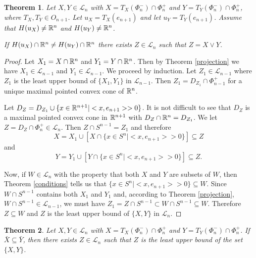 \documentclass[psamsfonts]{amsart}
\numberwithin{equation}{subsection}
\theoremstyle{plain}
\newtheorem{theorem}{Theorem}[section]
\theoremstyle{definition}
\theoremstyle{remark}
\begin{document}
\begin{theorem}  \label{OTHER}
Let $X, Y \in \mathcal{L}_n$ with $X = T_X(\Phi_n^-) \cap \Phi_n^+$ and $Y = T_Y(\Phi_n^-) \cap \Phi_n^+$, where $T_X, T_Y \in O_{n + 1}$. Let $u_X = T_X(e_{n + 1})$ and let $u_Y = T_Y(e_{n + 1})$. 
Assume that
$H(u_X) \not= \Bbb{R}^{n}$ and $H(u_Y) \not= \Bbb{R}^{n}$. 

If $H(u_X) \cap \Bbb{R}^{n} \not= H(u_Y) \cap \Bbb{R}^{n}$
 there exists $Z \in \mathcal{L}_{n}$ such that $Z = X \vee Y$. 
\end{theorem}
\begin{proof} Let $X_1 = X \cap \Bbb{R}^n$ and $Y_1 = Y  \cap \Bbb{R}^n$. Then
 by Theorem \ref{projection} we have 
 $X_1   \in \mathcal{L}_{n - 1} $ and $Y_1  \in \mathcal{L}_{n - 1}$.  We proceed by induction. Let $Z_1 \in \mathcal{L}_{n -1}$ where  $Z_1$ is the least upper bound of $\{X_1, Y_1\} $ in $
\mathcal{L}_{n -1}$.  Then  $Z_1 = D_{Z_1} \cap \Phi_{n - 1}^+$ for  a unique maximal pointed convex cone of $\Bbb{R}^n$. 

Let $D_Z = D_{Z_1} \cup \{x \in \Bbb{R}^{n + 1} | <x, e_{n + 1}> > 0\}$. It is not difficult to see that $D_Z$ is a maximal pointed convex cone in $\Bbb{R}^{n + 1}$ with $D_Z \cap \Bbb{R}^n = D_{Z_1}$.
We let $Z = D_Z \cap \Phi_n^+ \in \mathcal{L}_n$. Then 
$Z\cap S^{n - 1} = Z_1$ and therefore 
 $$X = X_1 \cup [X \cap \{x \in S^n | <x, e_{n + 1}> > 0\}] \subseteq Z$$
 and $$Y = Y_1 \cup [Y \cap \{x \in S^n | <x, e_{n + 1}> > 0\}] \subseteq Z.$$  

 Now, if $W \in \mathcal{L}_n$ with the property that both $X$ and $Y$ are subsets of $W$, then 
Theorem \ref{conditions} tells us that $\{x \in S^n | <x, e_{n + 1}> > 0\} \subseteq W$. Since $W\cap S^{n - 1}$ contains both $X_1$ and $Y_1$ and,
according to Theorem \ref{projection},
$W\cap S^{n - 1} \in \mathcal{L}_{n - 1}$,   we must have $Z_1 = Z\cap S^{n - 1} \subset W\cap S^{n - 1} \subseteq  W$. Therefore $Z \subseteq W$ and $Z$ is the least upper bound of $\{X, Y\}$ in $\mathcal{L}_n$. 
\end{proof}




\begin{theorem}\label{BAR}  Let $X, Y \in \mathcal{L}_n$ with $X = T_X(\Phi_n^-)\cap \Phi_n^+$ and $Y = T_Y(\Phi_n^-)\cap \Phi_n^+$. If $\bar{X} \subseteq \bar{Y}$, then there exists $Z \in \mathcal{L}_{n}$ such that $Z$ is the least upper bound of the set $\{X, Y\}$. 
\end{theorem}
\end{document}
